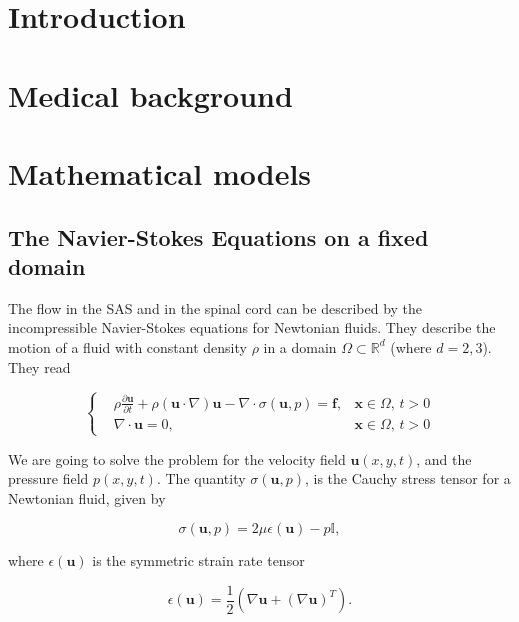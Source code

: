 \documentclass[11pt,a4paper,titlepage]{report}
\begin{document}

\tableofcontents 
{}

\newpage


\chapter{Introduction}

\chapter{Medical background}

\chapter{Mathematical models}


\section{The Navier-Stokes Equations on a fixed domain}

The flow in the SAS and in the spinal cord can be described by the incompressible Navier-Stokes equations for Newtonian fluids. They describe the motion of a fluid with constant density $\rho$ in a domain $\Omega \subset \mathbb{R}^d$ (where $d=2,3$). They read


\[
\left\{  
\begin{aligned}
&\rho \frac{\partial \mathbf{u}}{\partial t} + \rho (\mathbf{u} \cdot \nabla)\mathbf{u} - \nabla \cdot \sigma(\mathbf{u},p) = \mathbf{f},  & \mathbf{x} \in \Omega, \, t>0 \\
& \nabla \cdot \mathbf{u} = 0, & \mathbf{x} \in \Omega, \, t>0
\end{aligned}
\right.
\]

We are going to solve the problem for the velocity field $\mathbf{u}(x,y,t)$, and the pressure field $p(x,y,t)$. The quantity $\sigma(\mathbf{u}, p)$, is the Cauchy stress tensor for a Newtonian fluid, given by

\[
\sigma(\mathbf{u}, p) = 2 \mu \epsilon(\mathbf{u}) - p \mathbb{I},
\]

where $\epsilon(\mathbf{u})$ is the symmetric strain rate tensor

\[
\epsilon(\mathbf{u}) = \frac{1}{2} (\nabla \mathbf{u} + (\nabla \mathbf{u})^T).
\]
\end{document}
